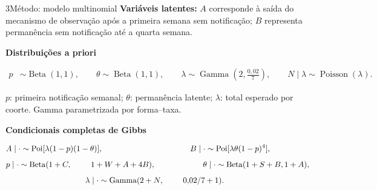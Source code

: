 \documentclass{rbras-poster}
\newcommand{\eqPosterPeq}{\fontsize{23bp}{29bp}\selectfont}
\newcommand{\textoMetodo}{\fontsize{21bp}{26bp}\selectfont}
\begin{document}
\begin{colunaesquerda}
\begin{secao}{3}{Método: modelo multinomial}
\textbf{Variáveis latentes:} $A$ corresponde à saída do mecanismo de
observação após a primeira semana sem notificação; $B$ representa
permanência sem notificação até a quarta semana.

\vspace{20pt}

{\tamRotulo\bfseries Distribuições a priori\par}
\begin{caixametodo}
{\eqPosterPeq
\begin{equation*}
\begin{aligned}
p&\sim\operatorname{Beta}(1,1), \quad \quad 
\theta \sim\operatorname{Beta}(1,1), \quad \quad 
\lambda\sim\operatorname{Gamma}\left(2,\frac{0{,}02}{7}\right), \quad \quad 
N\mid\lambda\sim\operatorname{Poisson}(\lambda).
\end{aligned}
\end{equation*}}
\end{caixametodo}
{\textoMetodo $p$: primeira notificação semanal; $\theta$:
permanência latente; $\lambda$: total esperado por coorte.
Gamma parametrizada por forma--taxa.\par}

\vspace{20pt}

{\tamRotulo\bfseries Condicionais completas de Gibbs\par}
\begin{caixametodo}
{\eqPosterPeq
\begin{equation*}
\begin{aligned}
&A\mid\cdot\sim\operatorname{Poi}[\lambda(1-p)(1-\theta)], \quad \quad \quad \quad \quad \quad  \quad \quad \quad \quad  \quad 
B\mid\cdot\sim\operatorname{Poi}[\lambda\theta(1-p)^4],\\[5bp]
&p\mid\cdot\sim\operatorname{Beta}(1+C,
\hspace{24bp}1+W+A+4B),\quad \quad \quad \quad \quad \quad
\theta\mid\cdot\sim\operatorname{Beta}(1+S+B,1+A), \\[5bp]
& \quad \quad \quad \quad  \quad \quad \quad \quad \quad  \quad  \lambda\mid\cdot\sim\operatorname{Gamma}(2+N,
\hspace{24bp}0{,}02/7+1).
\end{aligned}
\end{equation*}}
\end{caixametodo}


\end{secao}
\end{colunaesquerda}
\end{document}
